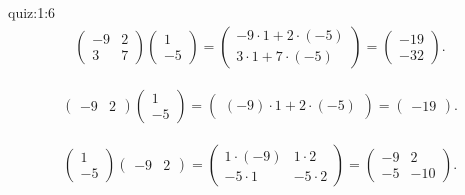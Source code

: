 \begin{answerof}{quiz:1:6}
  \begin{align*}
    \begin{pmatrix}
      -9&2\\3&7
    \end{pmatrix}
    \begin{pmatrix}
      1\\-5
    \end{pmatrix}=
    \begin{pmatrix}
     -9\cdot 1+2\cdot (-5)\\3\cdot 1+7\cdot (-5)
    \end{pmatrix}=
    \begin{pmatrix}
     -19\\-32
    \end{pmatrix}.
  \end{align*}


  
  \begin{align*}
    \begin{pmatrix}
      -9&2
    \end{pmatrix}
    \begin{pmatrix}
      1\\-5
    \end{pmatrix}
    =
    \begin{pmatrix}
      (-9)\cdot 1 + 2\cdot (-5)
    \end{pmatrix}
    =
    \begin{pmatrix}
      -19
    \end{pmatrix}.
  \end{align*}

  \begin{align*}
    \begin{pmatrix}
      1\\-5
    \end{pmatrix}
    \begin{pmatrix}
      -9&2
    \end{pmatrix}
    =
    \begin{pmatrix}
      1\cdot (-9)& 1\cdot 2\\-5\cdot 1&-5\cdot 2
    \end{pmatrix}
    =
    \begin{pmatrix}
      -9& 2\\-5&-10
    \end{pmatrix}.
  \end{align*}


\end{answerof}
